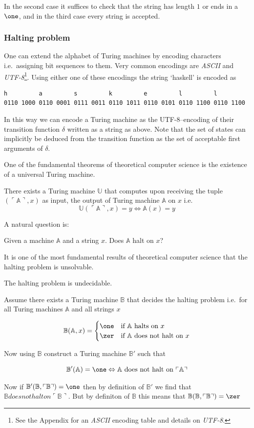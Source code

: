 In the second case it suffices to check that the string has length \(1\)
or ends in a \(\one\), and in the third case every string is accepted.

\subsubsection{Halting problem}\label{halting-problem}

One can extend the alphabet of Turing machines by encoding characters
i.e.~assigning bit sequences to them. Very common encodings are
\emph{ASCII} and \emph{UTF-8}\footnote{See the Appendix for an
  \emph{ASCII} encoding table and details on \emph{UTF-8}.}. Using
either one of these encodings the string `haskell' is encoded as

\begin{verbatim}
h         a         s         k         e         l         l
0110 1000 0110 0001 0111 0011 0110 1011 0110 0101 0110 1100 0110 1100
\end{verbatim}

In this way we can encode a Turing machine as the UTF-8--encoding of
their transition function \(δ\) written as a string as above. Note that
the set of states can implicitly be deduced from the transition function
as the set of acceptable first arguments of \(δ\).

One of the fundamental theorems of theoretical computer science is the
existence of a universal Turing machine.

There exists a Turing machine \(\mathbb U\) that computes upon receiving
the tuple \((\ulcorner \mathbb A \urcorner, x)\) as input, the output of
Turing machine \(\mathbb A\) on \(x\) i.e.
\[ \mathbb U(\ulcorner \mathbb A \urcorner, x) = y \Leftrightarrow \mathbb A (x) = y\]

A natural question is:

Given a machine \(\mathbb A\) and a string \(x\). Does \(\mathbb A\)
halt on \(x\)?

It is one of the most fundamental results of theoretical computer
science that the halting problem is unsolvable.

The halting problem is undecidable.

Assume there exists a Turing machine \(\mathbb B\) that decides the
halting problem i.e.~for all Turing machines \(\mathbb A\) and all
strings \(x\)

\[ \mathbb B(\mathbb A, x) =
\begin{cases}
  \one  & \text{if } \mathbb A \text{ halts on } x\\
  \zer  & \text{if } \mathbb A \text{ does not halt on } x
\end{cases}\]

Now using \(\mathbb B\) construct a Turing machine \(\mathbb B'\) such
that

\[ \mathbb B'(\mathbb A) = \one \Leftrightarrow \mathbb A \text{ does not halt on } \ulcorner \mathbb A\urcorner \]

Now if \(\mathbb B'(\mathbb B, \ulcorner \mathbb B\urcorner) = \one\)
then by definition of \(\mathbb B'\) we find that
\(\mathbb B does not halt on \ulcorner \mathbb B\urcorner\). But by
definiton of \(\mathbb B\) this means that
\(\mathbb B(\mathbb B, \ulcorner \mathbb B \urcorner) = \zer\)

